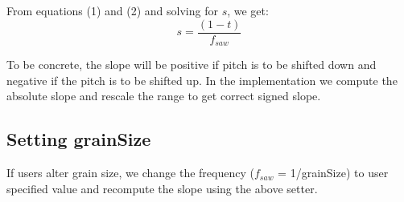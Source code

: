 \documentclass[20pt]{article}
\begin{document}
From equations (1) and (2) and solving for $s$, we get:
\begin{equation}
s = \frac{(1-t)}{f_{saw}}
\end{equation} 

To be concrete, the slope will be positive if pitch is to be shifted down and negative if the pitch is to be shifted up. In the implementation we compute the absolute slope and rescale the range to get correct signed slope.


\subsection*{Setting grainSize}
If users alter grain size, we change the frequency ($f_{saw}$ = 1/grainSize) to user specified value and recompute the slope using the above setter.
\end{document}
